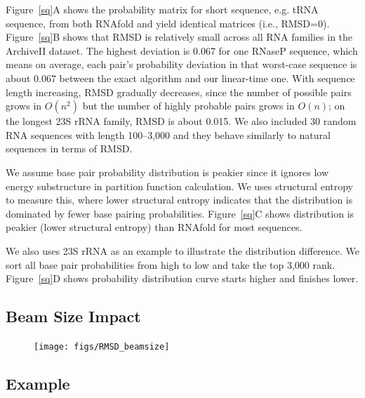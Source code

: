 Figure~\ref{sq}A shows the probability matrix for short sequence, e.g. tRNA sequence, from both RNAfold and \linearpartition yield identical matrices (i.e., RMSD=0). Figure~\ref{sq}B shows that RMSD is relatively small across all RNA families in the ArchiveII dataset. The highest deviation is 0.067 for one RNaseP sequence, which means on average, each pair’s probability deviation in that worst-case sequence is about 0.067 between the exact algorithm and our linear-time one. With sequence length increasing, RMSD gradually decreases, since the number of possible pairs grows in $O(n^2)$ but the number of highly probable pairs grows in $O(n)$; on the longest 23S rRNA family, RMSD is about 0.015. We also included 30 random RNA sequences with length 100–3,000 and they behave similarly to natural sequences in terms of RMSD. 

We assume \linearpartition base pair probability distribution is peakier since it ignores low energy substructure in partition function calculation.
We uses structural entropy \cite{Huynen+:1997} to measure this, 
where lower structural entropy indicates that the distribution is dominated by fewer base pairing probabilities.
Figure~\ref{sq}C shows \linearpartition distribution is peakier (lower structural entropy) than RNAfold for most sequences.

We also uses \ecoli 23S rRNA as an example to illustrate the distribution difference.
We sort all base pair probabilities from high to low and take the top 3,000 rank.
Figure~\ref{sq}D shows \linearpartition probability distribution curve starts higher and finishes lower.


\subsection{Beam Size Impact}



\begin{figure}[H]
\center
\texttt{[image: figs/RMSD\_beamsize]}
\end{figure}

\subsection{Example}


